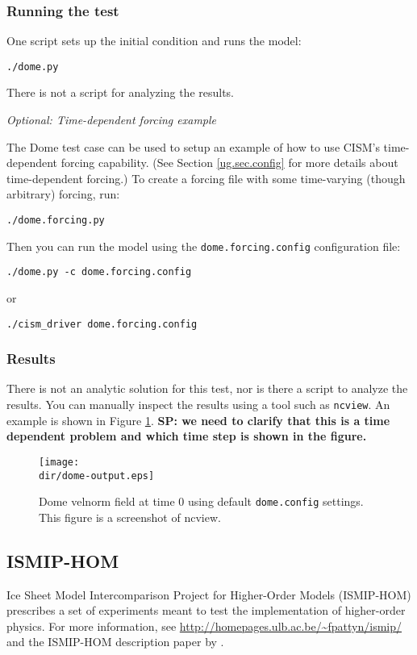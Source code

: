 \subsubsection{Running the test}
One script sets up the initial condition and runs the model:

\texttt{./dome.py}

There is not a script for analyzing the results.

\textit{Optional:  Time-dependent forcing example}

The Dome test case can be used to setup an example of how to use CISM's time-dependent
forcing capability.  (See Section \ref{ug.sec.config} for more details about time-dependent
forcing.)  To create a forcing file with some time-varying (though arbitrary) forcing, run:

\texttt{./dome.forcing.py}

Then you can run the model using the \texttt{dome.forcing.config} configuration file:

\texttt{./dome.py -c dome.forcing.config}

or

\texttt{./cism\_driver dome.forcing.config}


\subsubsection{Results}
There is not an analytic solution for this test, nor is there a script to analyze
the results.  You can manually inspect the results using a tool such as \texttt{ncview}.
An example is shown in Figure \ref{fig:domeresults}.
\textbf{SP: we need to clarify that this is a time dependent problem and which time step is shown in the figure.}
\begin{figure}[H!]
	\centering
	\texttt{[image: \\dir/dome-output.eps]}
	\caption{Dome velnorm field at time 0 using default \texttt{dome.config} settings. This figure is a screenshot of ncview.}
	\label{fig:domeresults}
\end{figure}
\FloatBarrier

\subsection{ISMIP-HOM}
Ice Sheet Model Intercomparison Project for Higher-Order Models (ISMIP-HOM)
prescribes a set of experiments meant to test the implementation of
higher-order physics.  For more information, see
\url{http://homepages.ulb.ac.be/~fpattyn/ismip/} and the ISMIP-HOM description paper
by \citet{Pattyn2008}.

